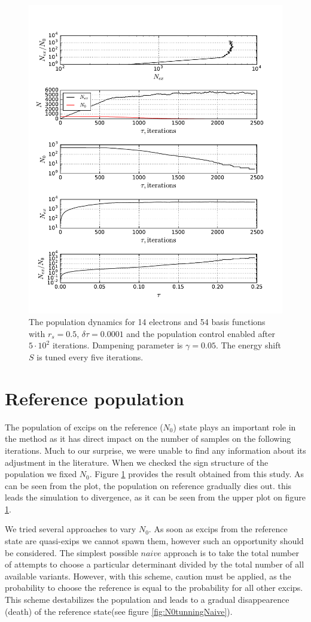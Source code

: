 \documentclass[twoside,english]{uiofysmaster}
\begin{document}
\begin{figure}[ht!]
	\centering
	\includegraphics[width=0.8\linewidth]{deathN0}
	\caption{The population dynamics for 14 electrons and 54 basis functions with $r_s=0.5$, $\delta \tau=0.0001$ and the population control enabled after $5\cdot 10^2$ iterations. Dampening parameter is $\gamma = 0.05$. The energy shift $S$ is tuned every five iterations.}
	\label{fig:deathN0}
\end{figure}

\section{Reference population}
The population of excips on the reference ($N_0$) state plays an important role in the
method as it has direct impact on the number of samples on the
following iterations. Much to our surprise, we were unable to find any
information about its adjustment in the literature. When we checked
the sign structure of the population we fixed $N_0$. Figure \ref{fig:deathN0} provides the
result obtained from this study. As can be seen from the plot, the
population on reference gradually dies out. this leads the simulation
to divergence, as it can be seen from the upper plot on figure
\ref{fig:deathN0}. 




We tried several approaches to vary $N_0$. As soon as excips from the
reference state are quasi-exips we cannot spawn them, however such
an opportunity should be considered. The simplest possible $naive$
approach is to take the total number of attempts to choose a
particular determinant divided by the total number of all available
variants. However, with this scheme, caution must be applied, as the
probability to choose the reference is equal to the probability for
all other excips. This scheme destabilizes the population and leads to
a gradual disappearence (death) of the reference state(see figure \ref{fig:N0tunningNaive}).
\end{document}
